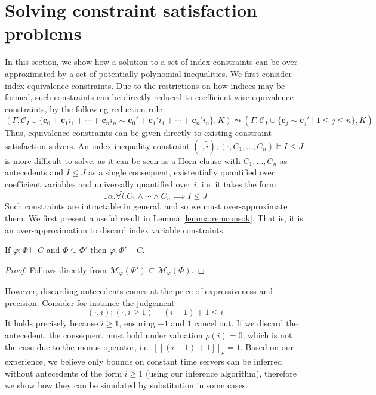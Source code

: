 \section{Solving constraint satisfaction problems}\label{sec:solvcons}

In this section, we show how a solution to a set of index constraints can be over-approximated by a set of potentially polynomial inequalities. We first consider index equivalence constraints. Due to the restrictions on how indices may be formed, such constraints can be directly reduced to coefficient-wise equivalence constraints, by the following reduction rule
\begin{equation*}
    (\Gamma,\mathcal{C}_I \cup \{\mathbf{c}_0 + \mathbf{c}_1 i_1 + \cdots + \mathbf{c}_n i_n \sim \mathbf{c}_0' + \mathbf{c}_1' i_1 + \cdots + \mathbf{c}_n' i_n\},K) \leadsto (\Gamma,\mathcal{C}_I \cup \{ \mathbf{c}_j \sim \mathbf{c}_j' \mid 1 \leq j \leq n \},K)
\end{equation*}
Thus, equivalence constraints can be given directly to existing constraint satisfaction solvers. An index inequality constraint $(\cdot,\widetilde{i});(\cdot,C_1,\dots,C_n)\vDash I \leq J$ is more difficult to solve, as it can be seen as a Horn-clause with $C_1,\dots,C_n$ as antecedents and $I\leq J$ as a single consequent, existentially quantified over coefficient variables and universally quantified over $\widetilde{i}$, i.e. it takes the form
\begin{equation*}
    \exists\widetilde{\alpha}.\forall\widetilde{i}.C_1\land\cdots\land C_n \implies I \leq J
\end{equation*}
Such constraints are intractable in general, and so we must over-approximate them. We first present a useful result in Lemma \ref{lemma:remconsok}. That is, it is an over-approximation to discard index variable constraints.
%
\begin{lemma}\label{lemma:remconsok}
If $\varphi;\Phi\vDash C$ and $\Phi\subseteq\Phi'$ then $\varphi;\Phi'\vDash C$.
\begin{proof}
Follows directly from $\mathcal{M}_\varphi(\Phi') \subseteq \mathcal{M}_\varphi(\Phi)$.
\end{proof}
\end{lemma}
%
However, discarding antecedents comes at the price of expressiveness and precision. Consider for instance the judgement
\begin{equation*}
    (\cdot,i);(\cdot,i\geq 1)\vDash (i-1) + 1 \leq i
\end{equation*}
It holds precisely because $i\geq 1$, ensuring $-1$ and $1$ cancel out. If we discard the antecedent, the consequent must hold under valuation $\rho(i)=0$, which is not the case due to the monus operator, i.e. $[\![(i-1)+1]\!]_\rho = 1$. Based on our experience, we believe only bounds on constant time servers can be inferred without antecedents of the form $i\geq 1$ (using our inference algorithm), therefore we show how they can be simulated by substitution in some cases.\\

